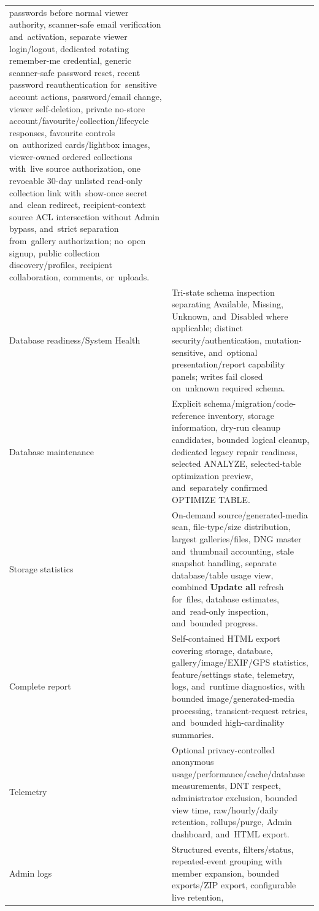 \documentclass[11pt,a4paper]{article}
\newcommand{\ui}[1]{\textbf{#1}}
\begin{document}
\begin{longtable}{%
    >{\raggedright\arraybackslash}p{}%
    >{\raggedright\arraybackslash}p{}%
}
passwords before normal viewer authority, scanner-safe email verification
and~activation, separate viewer login/logout, dedicated rotating remember-me
credential, generic scanner-safe password reset, recent password
reauthentication for~sensitive account actions, password/email change, viewer
self-deletion, private no-store account/favourite/collection/lifecycle
responses, favourite controls on~authorized cards/lightbox images, viewer-owned
ordered collections with~live source authorization, one revocable 30-day
unlisted read-only collection link with~show-once secret and~clean redirect,
recipient-context source ACL intersection without Admin bypass, and~strict
separation from~gallery authorization; no~open signup, public collection
discovery/profiles, recipient collaboration, comments, or~uploads.\\
Database readiness/System Health & Tri-state schema inspection separating
Available, Missing, Unknown, and~Disabled where applicable; distinct
security/authentication, mutation-sensitive, and~optional presentation/report
capability panels; writes fail closed on~unknown required schema.\\
Database maintenance & Explicit schema/migration/code-reference inventory,
storage information, dry-run cleanup candidates, bounded logical cleanup,
dedicated legacy repair readiness, selected ANALYZE, selected-table optimization
preview, and~separately confirmed OPTIMIZE TABLE.\\
Storage statistics & On-demand source/generated-media scan, file-type/size
distribution, largest galleries/files, DNG master and~thumbnail accounting,
stale snapshot handling, separate database/table usage view, combined \ui{Update
all} refresh for~files, database estimates, and~read-only inspection,
and~bounded progress.\\
Complete report & Self-contained HTML export covering storage, database,
gallery/image/EXIF/GPS statistics, feature/settings state, telemetry, logs,
and~runtime diagnostics, with bounded image/generated-media processing,
transient-request retries, and~bounded high-cardinality summaries.\\
Telemetry & Optional privacy-controlled anonymous
usage/performance/cache/database measurements, DNT respect, administrator
exclusion, bounded view time, raw/hourly/daily retention, rollups/purge, Admin
dashboard, and~HTML export.\\
Admin logs & Structured events, filters/status, repeated-event grouping with
member expansion, bounded exports/ZIP export, configurable live retention,

\end{longtable}
\end{document}
